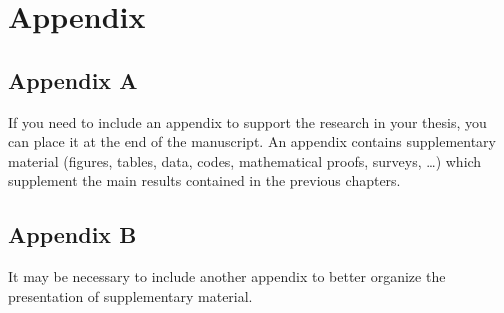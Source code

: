 \chapter*{Appendix}

\section*{Appendix A}
If you need to include an appendix to support the research in your thesis, you can place it at the end of the manuscript.
An appendix contains supplementary material (figures, tables, data, codes, mathematical proofs, surveys, \dots)
which supplement the main results contained in the previous chapters.

\section*{Appendix B}
It may be necessary to include another appendix to better organize the presentation of supplementary material.


